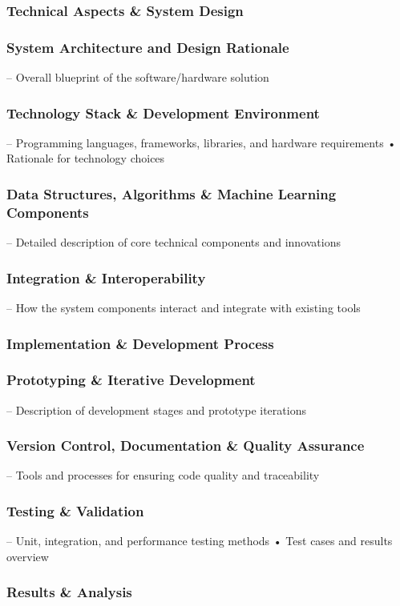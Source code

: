 \subsubsection{Technical Aspects \& System Design}
\subsubsection{System Architecture and Design Rationale}
– Overall blueprint of the software/hardware solution
\subsubsection{Technology Stack \& Development Environment}
– Programming languages, frameworks, libraries, and hardware requirements
• Rationale for technology choices
\subsubsection{Data Structures, Algorithms \& Machine Learning Components}
– Detailed description of core technical components and innovations
\subsubsection{Integration \& Interoperability}
– How the system components interact and integrate with existing tools
\subsubsection{Implementation \& Development Process}
\subsubsection{Prototyping \& Iterative Development}
– Description of development stages and prototype iterations
\subsubsection{Version Control, Documentation \& Quality Assurance}
– Tools and processes for ensuring code quality and traceability
\subsubsection{Testing \& Validation}
– Unit, integration, and performance testing methods
• Test cases and results overview
\subsubsection{Results \& Analysis}
